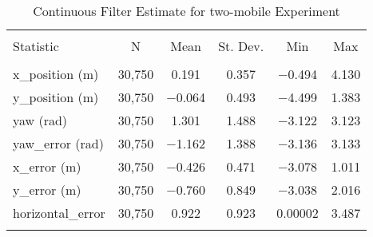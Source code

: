 
\begin{table}[h] \centering 
  \caption{Continuous Filter Estimate for two-mobile Experiment} 
  \label{tab:two_mobile_continuous_summary} 
\begin{tabular}{@{\extracolsep{5pt}}lccccc} 
\\[-1.8ex]\hline 
\hline \\[-1.8ex] 
Statistic & \multicolumn{1}{c}{N} & \multicolumn{1}{c}{Mean} & \multicolumn{1}{c}{St. Dev.} & \multicolumn{1}{c}{Min} & \multicolumn{1}{c}{Max} \\ 
\hline \\[-1.8ex] 
x\_position (m) & 30,750 & \num{0.191} & \num{0.357} & \num{-0.494} & \num{4.130} \\ 
y\_position (m) & 30,750 & \num{-0.064} & \num{0.493} & \num{-4.499} & \num{1.383} \\ 
yaw (rad) & 30,750 & \num{1.301} & \num{1.488} & \num{-3.122} & \num{3.123} \\ 
yaw\_error (rad) & 30,750 & \num{-1.162} & \num{1.388} & \num{-3.136} & \num{3.133} \\ 
x\_error (m) & 30,750 & \num{-0.426} & \num{0.471} & \num{-3.078} & \num{1.011} \\ 
y\_error (m) & 30,750 & \num{-0.760} & \num{0.849} & \num{-3.038} & \num{2.016} \\ 
horizontal\_error & 30,750 & \num{0.922} & \num{0.923} & \num{0.00002} & \num{3.487} \\ 
\hline \\[-1.8ex] 
\end{tabular} 
\end{table} 
